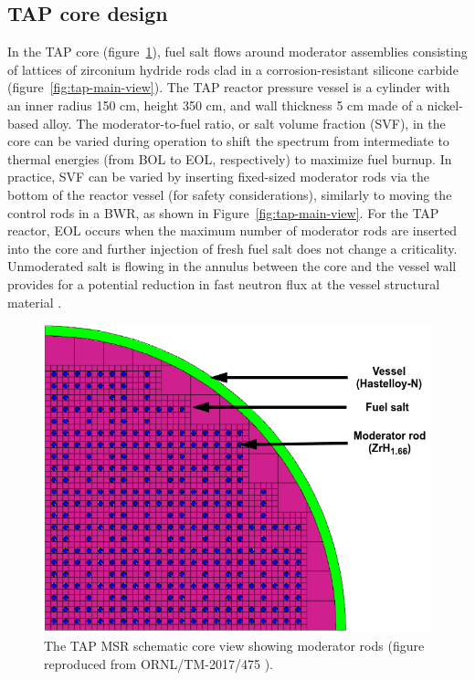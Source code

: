 \documentclass[12pt]{article} %
\begin{document}
\subsection{TAP core design}
In the \gls{TAP} core (figure~\ref{fig:tap-core-view}), fuel salt flows around 
moderator assemblies consisting 
of lattices of 
zirconium hydride rods clad in a corrosion-resistant silicone carbide 
(figure~\ref{fig:tap-main-view}). The \gls{TAP} reactor pressure vessel is a 
cylinder with an inner radius 150 cm, height 350 cm, and wall thickness 5 cm made 
of a nickel-based alloy. The moderator-to-fuel ratio, or salt volume fraction 
(SVF), in the core can be varied during operation to 
shift the spectrum from intermediate to thermal energies (from \gls{BOL} to 
\gls{EOL}, respectively) to maximize fuel burnup. In practice, SVF can be 
varied by inserting fixed-sized moderator rods via the bottom of the reactor 
vessel (for safety considerations), similarly to moving the control rods in 
a \gls{BWR}, as shown in Figure~\ref{fig:tap-main-view}. For the \gls{TAP} 
reactor, \gls{EOL} occurs when the maximum number of moderator rods are 
inserted into the core and further injection of fresh fuel salt does not 
change a criticality. Unmoderated salt is flowing in the annulus 
between the core and the vessel wall provides for a potential reduction in 
fast neutron flux at the vessel structural material  \cite{transatomic_power_corporation_neutronics_2016}.
\begin{figure}[t] %
		  \includegraphics[width=\textwidth]{tap_core_ornl.png}
	  	\vspace{-0.35in}
  \caption{The \gls{TAP} \gls{MSR} schematic core view showing moderator rods 
  (figure reproduced from ORNL/TM-2017/475  
\cite{betzler_assessment_2017}).}
  \label{fig:tap-core-view}
\end{figure}
\end{document}
